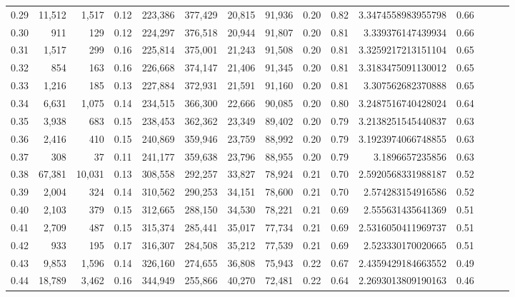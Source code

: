 \begin{tabular}{rrrrrrrrrrrrrrr}
0.29 &  11,512 &   1,517 &  0.12 &  223,386 &  377,429 &   20,815 &   91,936 &  0.20 &  0.82 &    3.3474558983955798 &      0.66 \\
0.30 &     911 &     129 &  0.12 &  224,297 &  376,518 &   20,944 &   91,807 &  0.20 &  0.81 &     3.339376147439934 &      0.66 \\
0.31 &   1,517 &     299 &  0.16 &  225,814 &  375,001 &   21,243 &   91,508 &  0.20 &  0.81 &    3.3259217213151104 &      0.65 \\
0.32 &     854 &     163 &  0.16 &  226,668 &  374,147 &   21,406 &   91,345 &  0.20 &  0.81 &    3.3183475091130012 &      0.65 \\
0.33 &   1,216 &     185 &  0.13 &  227,884 &  372,931 &   21,591 &   91,160 &  0.20 &  0.81 &     3.307562682370888 &      0.65 \\
0.34 &   6,631 &   1,075 &  0.14 &  234,515 &  366,300 &   22,666 &   90,085 &  0.20 &  0.80 &    3.2487516740428024 &      0.64 \\
0.35 &   3,938 &     683 &  0.15 &  238,453 &  362,362 &   23,349 &   89,402 &  0.20 &  0.79 &    3.2138251545440837 &      0.63 \\
0.36 &   2,416 &     410 &  0.15 &  240,869 &  359,946 &   23,759 &   88,992 &  0.20 &  0.79 &    3.1923974066748855 &      0.63 \\
0.37 &     308 &      37 &  0.11 &  241,177 &  359,638 &   23,796 &   88,955 &  0.20 &  0.79 &       3.1896657235856 &      0.63 \\
0.38 &  67,381 &  10,031 &  0.13 &  308,558 &  292,257 &   33,827 &   78,924 &  0.21 &  0.70 &    2.5920568331988187 &      0.52 \\
0.39 &   2,004 &     324 &  0.14 &  310,562 &  290,253 &   34,151 &   78,600 &  0.21 &  0.70 &     2.574283154916586 &      0.52 \\
0.40 &   2,103 &     379 &  0.15 &  312,665 &  288,150 &   34,530 &   78,221 &  0.21 &  0.69 &     2.555631435641369 &      0.51 \\
0.41 &   2,709 &     487 &  0.15 &  315,374 &  285,441 &   35,017 &   77,734 &  0.21 &  0.69 &    2.5316050411969737 &      0.51 \\
0.42 &     933 &     195 &  0.17 &  316,307 &  284,508 &   35,212 &   77,539 &  0.21 &  0.69 &     2.523330170020665 &      0.51 \\
0.43 &   9,853 &   1,596 &  0.14 &  326,160 &  274,655 &   36,808 &   75,943 &  0.22 &  0.67 &    2.4359429184663552 &      0.49 \\
0.44 &  18,789 &   3,462 &  0.16 &  344,949 &  255,866 &   40,270 &   72,481 &  0.22 &  0.64 &    2.2693013809190163 &      0.46 \\

\end{tabular}
